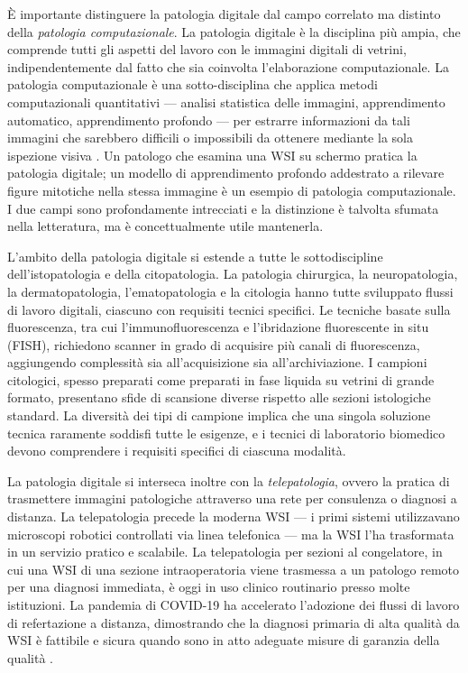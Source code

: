È importante distinguere la patologia digitale dal campo correlato ma distinto della \emph{patologia computazionale}. La patologia digitale è la disciplina più ampia, che comprende tutti gli aspetti del lavoro con le immagini digitali di vetrini, indipendentemente dal fatto che sia coinvolta l'elaborazione computazionale. La patologia computazionale è una sotto-disciplina che applica metodi computazionali quantitativi --- analisi statistica delle immagini, apprendimento automatico, apprendimento profondo --- per estrarre informazioni da tali immagini che sarebbero difficili o impossibili da ottenere mediante la sola ispezione visiva \cite{campanella2019}. Un patologo che esamina una WSI su schermo pratica la patologia digitale; un modello di apprendimento profondo addestrato a rilevare figure mitotiche nella stessa immagine è un esempio di patologia computazionale. I due campi sono profondamente intrecciati e la distinzione è talvolta sfumata nella letteratura, ma è concettualmente utile mantenerla.

L'ambito della patologia digitale si estende a tutte le sottodiscipline dell'istopatologia e della citopatologia. La patologia chirurgica, la neuropatologia, la dermatopatologia, l'ematopatologia e la citologia hanno tutte sviluppato flussi di lavoro digitali, ciascuno con requisiti tecnici specifici. Le tecniche basate sulla fluorescenza, tra cui l'immunofluorescenza e l'ibridazione fluorescente in situ (FISH), richiedono scanner in grado di acquisire più canali di fluorescenza, aggiungendo complessità sia all'acquisizione sia all'archiviazione. I campioni citologici, spesso preparati come preparati in fase liquida su vetrini di grande formato, presentano sfide di scansione diverse rispetto alle sezioni istologiche standard. La diversità dei tipi di campione implica che una singola soluzione tecnica raramente soddisfi tutte le esigenze, e i tecnici di laboratorio biomedico devono comprendere i requisiti specifici di ciascuna modalità.

La patologia digitale si interseca inoltre con la \emph{telepatologia}, ovvero la pratica di trasmettere immagini patologiche attraverso una rete per consulenza o diagnosi a distanza. La telepatologia precede la moderna WSI --- i primi sistemi utilizzavano microscopi robotici controllati via linea telefonica --- ma la WSI l'ha trasformata in un servizio pratico e scalabile. La telepatologia per sezioni al congelatore, in cui una WSI di una sezione intraoperatoria viene trasmessa a un patologo remoto per una diagnosi immediata, è oggi in uso clinico routinario presso molte istituzioni. La pandemia di COVID-19 ha accelerato l'adozione dei flussi di lavoro di refertazione a distanza, dimostrando che la diagnosi primaria di alta qualità da WSI è fattibile e sicura quando sono in atto adeguate misure di garanzia della qualità \cite{song2023,giaretto2021}.

